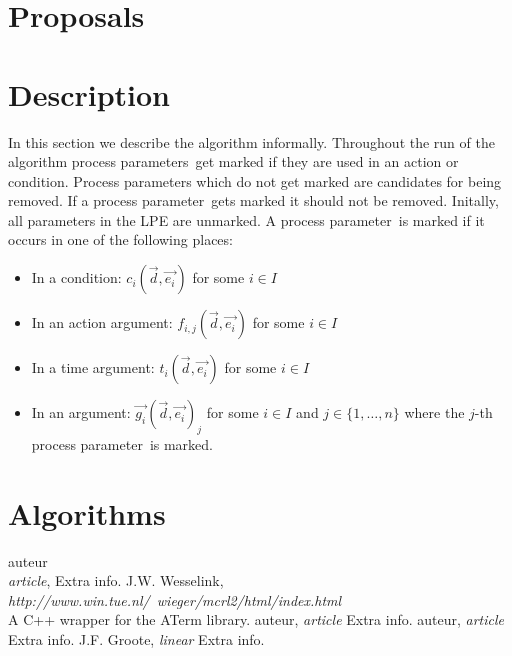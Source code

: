 \documentclass[a4paper,10pt]{article}
\theoremstyle{plain}
\theoremstyle{definition}
\newcommand{\ovr}{\overrightarrow}
\newcommand{\pp}{process parameter}
\newcommand{\pps}{process parameters}
\begin{document}
\section{Proposals}

\section{Description}
In this section we describe the algorithm informally. Throughout the run of the algorithm \pps\ get marked if they are used in an action or condition. Process parameters which do not get marked are candidates for being removed. If a \pp\ gets marked it should not be removed. Initally, all parameters in the LPE are unmarked. A \pp\ is marked if it occurs in one of the following places:

\begin{itemize}
\item In a condition: $c_i(\ovr{d},\ovr{e_i})$ for some $i \in I$
\item In an action argument: $f_{i,j}(\ovr{d},\ovr{e_i})$ for some $i \in I$
\item In a time argument: $t_i(\ovr{d},\ovr{e_i})$ for some $i \in I$
\item In an argument: $\ovr{g_i}(\ovr{d},\ovr{e_i})_j$ for some $i \in I$ and $j \in \lbrace 1, \ldots , n \rbrace$ where the $j$-th \pp\ is marked.

\end{itemize}

\section{Algorithms} \label{sec:alg}

\begin{thebibliography}{99}   auteur\\
   \textit{article},
   Extra info.
   J.W. Wesselink,
   \textit{http://www.win.tue.nl/~wieger/mcrl2/html/index.html}\\
   A C++ wrapper for the ATerm library.
   auteur,
   \textit{article}
   Extra info.
   auteur,
   \textit{article}
   Extra info.
   J.F. Groote,
   \textit{linear}
   Extra info.

\end{thebibliography}
\end{document}

